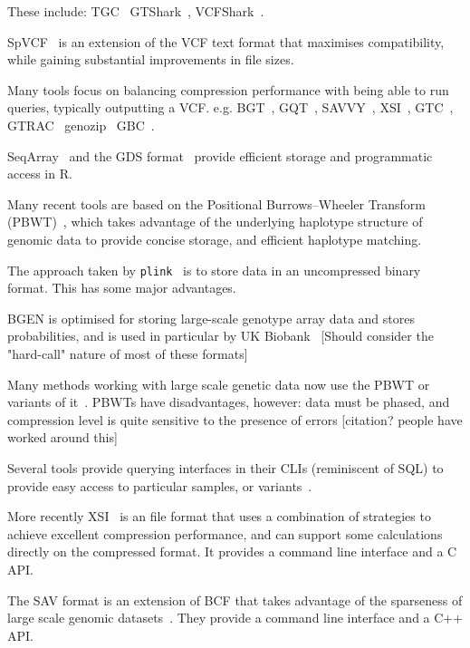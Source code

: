 \documentclass[a4paper,num-refs]{oup-contemporary}
\newcommand{\toolname}[1]{\texttt{#1}}
\begin{document}
These include:
TGC~\citep{deorowicz2013genome}
GTShark~\citep{deorowicz2019gtshark},
VCFShark~\citep{deorowicz2021vcfshark}.

SpVCF~\citep{lin2020sparse} is an extension of the VCF text
format that maximises compatibility, while gaining substantial
improvements in file sizes.

Many tools focus on balancing compression performance with
being able to run queries, typically outputting a VCF.
e.g.
BGT~\citep{li2016bgt},
GQT~\citep{layer2016efficient},
SAVVY~\citep{lefaive2021sparse},
XSI~\citep{wertenbroek2022xsi},
GTC~\citep{danek2018gtc},
GTRAC~\citep{tatwawadi2016gtrac}
genozip~\citep{lan2020genozip,lan2021genozip}
GBC~\citep{zhang2023gbc}.

SeqArray~\citep{zheng2017seqarray} and the GDS format~\citep{zheng2012high}
provide efficient storage and programmatic access in R.


Many recent tools are based on the Positional Burrows--Wheeler
Transform (PBWT)~\citep{durbin2014efficient}, which takes advantage
of the underlying haplotype structure of genomic data to provide
concise storage, and efficient haplotype matching.

The approach taken by \toolname{plink}~\citep{purcell2007plink,chang2015second} is to
store data in an uncompressed binary format. This has some major
advantages.

BGEN \citep{band2018bgen} is optimised for storing large-scale
genotype array data and stores probabilities, and is used
in particular by UK Biobank~\citep{bycroft2018genome}
[Should consider the "hard-call" nature of most of these formats]

Many methods working with large scale genetic
data now use the PBWT or variants of
it~\citep[e.g.][]{li2016bgt,lefaive2021sparse,wertenbroek2022xsi}. PBWTs have
disadvantages, however: data must be phased, and compression level
is quite sensitive to the presence of errors [citation? people have
worked around this]

Several tools provide querying interfaces in their CLIs
(reminiscent of SQL) to provide easy access to particular samples, or
variants~\cite{li2016bgt,layer2016efficient}.

More recently XSI~\citep{wertenbroek2022xsi} is an file format that
uses a combination of strategies to achieve excellent compression
performance, and can support some calculations directly on the
compressed format. It provides a command line interface and a
C API.

The SAV format is an extension of BCF that takes advantage
of the sparseness of large scale genomic datasets~\citep{lefaive2021sparse}.
They provide a command line interface and a C++ API.
\end{document}
